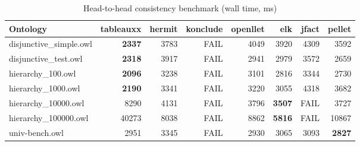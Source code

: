 \begin{table}[t]
\centering
\caption{Head-to-head consistency benchmark (wall time, ms)}
\label{tab:head_to_head_wall_ms}
\begin{tabular}{lrrrrrrr}
\toprule
Ontology & tableauxx & hermit & konclude & openllet & elk & jfact & pellet \\
\midrule
disjunctive\_simple.owl & \textbf{2337} & 3783 & FAIL & 4049 & 3920 & 4309 & 3592 \\
disjunctive\_test.owl & \textbf{2318} & 3917 & FAIL & 2941 & 2979 & 3572 & 2659 \\
hierarchy\_100.owl & \textbf{2096} & 3238 & FAIL & 3101 & 2816 & 3344 & 2730 \\
hierarchy\_1000.owl & \textbf{2190} & 3341 & FAIL & 3220 & 3055 & 4318 & 3682 \\
hierarchy\_10000.owl & 8290 & 4131 & FAIL & 3796 & \textbf{3507} & FAIL & 3727 \\
hierarchy\_100000.owl & 40273 & 8038 & FAIL & 8862 & \textbf{5816} & FAIL & 10867 \\
univ-bench.owl & 2951 & 3345 & FAIL & 2930 & 3065 & 3093 & \textbf{2827} \\
\bottomrule
\end{tabular}
\end{table}
